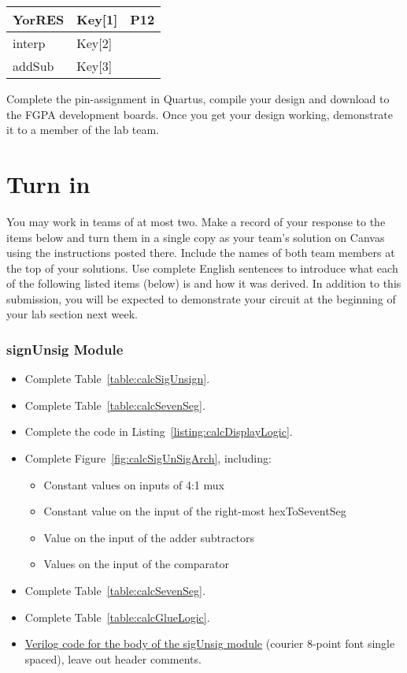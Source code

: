 \begin{longtable}[]{@{}
|  >{\raggedright\arraybackslash}p{}|
  >{\raggedright\arraybackslash}p{}|
  >{\raggedright\arraybackslash}p{}|@{}}
\toprule()
YorRES & Key{[}1{]} & P12 \\
\midrule()
\endhead
interp & Key{[}2{]} & \\ \hline
addSub & Key{[}3{]} & \\ \hline
\bottomrule()
\end{longtable}

Complete the pin-assignment in Quartus, compile your design and download to the FGPA
development boards. Once you get your design working, demonstrate it to a member of the lab team.


\section{Turn in}

You may work in teams of at most two. Make a record of your response to
the items below and turn them in a single copy as your team's solution
on Canvas using the instructions posted there. Include the names of both
team members at the top of your solutions. Use complete English
sentences to introduce what each of the following listed items (below)
is and how it was derived. In addition to this submission, you will be
expected to demonstrate your circuit at the beginning of your lab
section next week.

\subsubsection{signUnsig Module}

\begin{itemize}
\item
  Complete Table~\ref{table:calcSigUnsign}.
\item
  Complete Table~\ref{table:calcSevenSeg}.
\item
  Complete the code in Listing~\ref{listing:calcDisplayLogic}.
\item
  Complete Figure~\ref{fig:calcSigUnSigArch}, including:

  \begin{itemize}
  \item
    Constant values on inputs of 4:1 mux
  \item
    Constant value on the input of the right-most hexToSeventSeg
  \item
    Value on the input of the adder subtractors
  \item
    Values on the input of the comparator
  \end{itemize}
\item
  Complete Table~\ref{table:calcSevenSeg}.
\item
  Complete Table~\ref{table:calcGlueLogic}.
\item
  \protect\hyperlink{sigUnsign_Verilog}{Verilog code for the body of the
  sigUnsig module} (courier 8-point font single spaced), leave out
  header comments.
\end{itemize}


